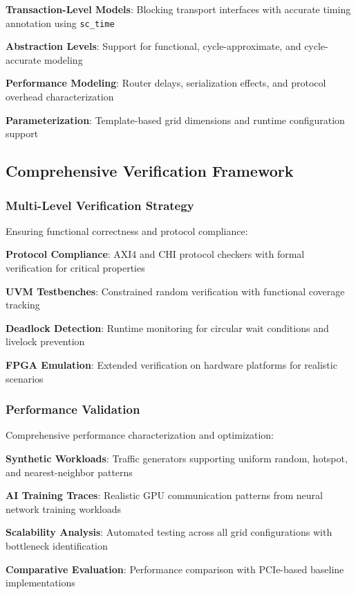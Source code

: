 \documentclass[11pt,a4paper]{article}
\begin{document}
\begin{techlist}
    \item \textbf{Transaction-Level Models}: Blocking transport interfaces with accurate timing annotation using \texttt{sc\_time}
    \item \textbf{Abstraction Levels}: Support for functional, cycle-approximate, and cycle-accurate modeling
    \item \textbf{Performance Modeling}: Router delays, serialization effects, and protocol overhead characterization
    \item \textbf{Parameterization}: Template-based grid dimensions and runtime configuration support
\end{techlist}

\subsection{Comprehensive Verification Framework}

\subsubsection{Multi-Level Verification Strategy}
Ensuring functional correctness and protocol compliance:

\begin{techlist}
    \item \textbf{Protocol Compliance}: AXI4 and CHI protocol checkers with formal verification for critical properties
    \item \textbf{UVM Testbenches}: Constrained random verification with functional coverage tracking
    \item \textbf{Deadlock Detection}: Runtime monitoring for circular wait conditions and livelock prevention
    \item \textbf{FPGA Emulation}: Extended verification on hardware platforms for realistic scenarios
\end{techlist}

\subsubsection{Performance Validation}
Comprehensive performance characterization and optimization:

\begin{techlist}
    \item \textbf{Synthetic Workloads}: Traffic generators supporting uniform random, hotspot, and nearest-neighbor patterns
    \item \textbf{AI Training Traces}: Realistic GPU communication patterns from neural network training workloads
    \item \textbf{Scalability Analysis}: Automated testing across all grid configurations with bottleneck identification
    \item \textbf{Comparative Evaluation}: Performance comparison with PCIe-based baseline implementations
\end{techlist}
\end{document}
